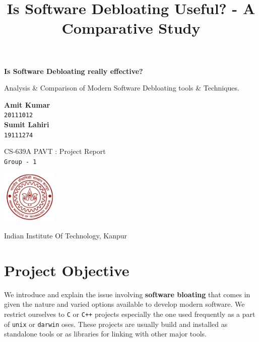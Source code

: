 \documentclass{relatorio}
\title{Is Software Debloating Useful? - A Comparative Study}
\begin{document}
\begin{titlepage}
	\begin{center}
		\vspace*{2cm}
		
		\textbf{Is Software Debloating really effective?}
		
		\vspace{0.5cm}
		Analysis \& Comparison of Modern Software Debloating tools \& Techniques.
		
		\vspace{1.5cm} 
		\textbf{Amit Kumar} \\
		\texttt{20111012} \\
		\vspace{1.5cm}
		\textbf{Sumit Lahiri} \\
		\texttt{19111274} \\
		\vfill
		
		CS-639A PAVT : Project Report \\
		\texttt{Group - 1} \\
		\vspace{0.8cm}
		
		\includegraphics[width=0.2\textwidth]{imgs/university.jpg}
		
		\Large
		Indian Institute Of Technology, Kanpur
		
	\end{center}
\end{titlepage}
	
	\onecolumn
	\tableofcontents
	\twocolumn  
	
	\maketitle{}

\section{Project Objective}%

We introduce and explain the issue involving \textbf{software bloating} that comes in given the nature and varied options 
available to develop modern software. We restrict ourselves to \texttt{C} or \texttt{C++} projects especially the one used frequently
as a part of \texttt{unix} or \texttt{darwin} oses. These projects are usually build and installed as standalone tools or as libraries 
for linking with other major tools. 
\end{document}
